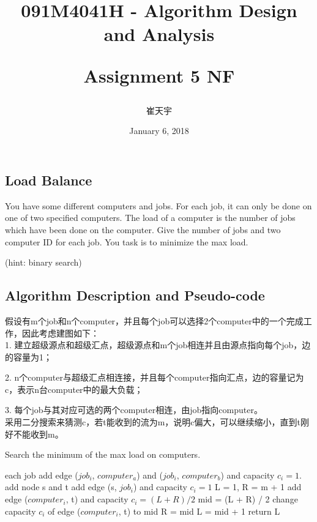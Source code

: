 \documentclass{article}
\begin{document}
\begin{CJK*}{UTF8}{gbsn}

\title{091M4041H - Algorithm Design and Analysis\\ [2ex] \begin{large} Assignment 5 NF\end{large}}
\author{崔天宇}
\date{January 6, 2018}

\maketitle

\tableofcontents

\newpage
\section{Load Balance}
You have some different computers and jobs. For each job, it can only be done on one of two specified computers. The load of a computer is the number of jobs which have been done on the computer. Give the number of jobs and two computer ID for each job. You task is to minimize the max load. 

(hint: binary search)

\subsection{Algorithm Description and Pseudo-code}
假设有m个job和n个computer，并且每个job可以选择2个computer中的一个完成工作，因此考虑建图如下：\\


1. 建立超级源点和超级汇点，超级源点和m个job相连并且由源点指向每个job，边的容量为1；

2. n个computer与超级汇点相连接，并且每个computer指向汇点，边的容量记为c，表示n台computer中的最大负载；

3. 每个job与其对应可选的两个computer相连，由job指向computer。\\


采用二分搜索来猜测c，若t能收到的流为m，说明c偏大，可以继续缩小，直到t刚好不能收到m。

\begin{algorithm}[htbp]  
  \caption{Search the minimum of the max load on computers.}  
  \begin{algorithmic}[1] 
	\For each job
	\State add edge ($job_i$, $computer_a$) and ($job_i$, $computer_b$) and capacity $c_i = 1.$
	\EndFor
	\State add node s and t
	\State add edge (s, $job_i$) and capacity $c_i = 1$
	\State L = 1, R = m + 1
	\State add edge ($computer_i$, t) and capacity $c_i = (L + R)/ 2$
	\State mid = (L + R) / 2
 	\State change capacity $c_i$ of edge ($computer_i$, t) to mid
	\State R = mid
	\Else
	\State L = mid + 1
	\EndIf
	\EndWhile
	\State return L
    \EndFunction 
  \end{algorithmic}  
\end{algorithm} 


\end{CJK*}
\end{document}
